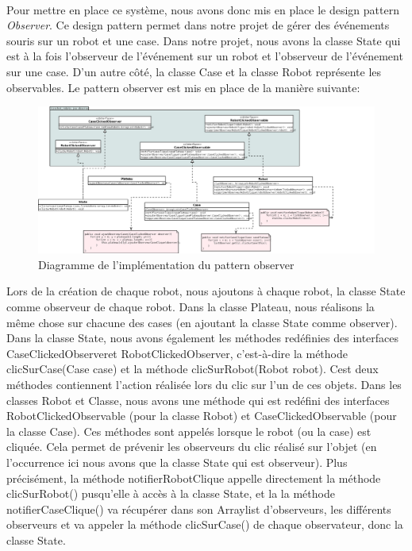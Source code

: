 \documentclass[a4paper, 12pt]{article}
\begin{document}
            \paragraph{}
            Pour mettre en place ce système, nous avons donc mis en place le design pattern \textit{Observer}. Ce design pattern permet dans notre projet de gérer des événements souris sur un robot et une case. Dans notre projet, nous avons la classe State qui est à la fois l'observeur de l'événement sur un robot et l'observeur de l'événement sur une case. D'un autre côté, la classe Case et la classe Robot représente les observables. Le pattern observer est mis en place de la manière suivante:
            
           \begin{figure}[H]
                \centering
                \includegraphics[scale=0.25]{images/patternObserverRobot.png}
                \caption{Diagramme de l'implémentation du pattern observer}
            \end{figure}
            
            Lors de la création de chaque robot, nous ajoutons à chaque robot, la classe State comme observeur de chaque robot. Dans la classe Plateau, nous réalisons la même chose sur chacune des cases (en ajoutant la classe State comme observer). Dans la classe State, nous avons également les méthodes redéfinies des interfaces CaseClickedObserveret RobotClickedObserver, c'est-à-dire la méthode clicSurCase(Case case) et la méthode clicSurRobot(Robot robot). Cest deux méthodes contiennent l'action réalisée lors du clic sur l'un de ces objets. Dans les classes Robot et Classe, nous avons une méthode qui est redéfini des interfaces RobotClickedObservable (pour la classe Robot) et CaseClickedObservable  (pour la classe Case). Ces méthodes sont appelés lorsque le robot (ou la case) est cliquée. Cela permet de prévenir les observeurs du clic réalisé sur l'objet (en l'occurrence ici nous avons que la classe State qui est observeur). Plus précisément, la méthode notifierRobotClique appelle directement la méthode clicSurRobot() pusqu'elle à accès à la classe State, et la la méthode notifierCaseClique() va récupérer dans son Arraylist d'observeurs, les différents observeurs et va appeler la méthode clicSurCase() de chaque observateur, donc la classe State.
            
\end{document}
